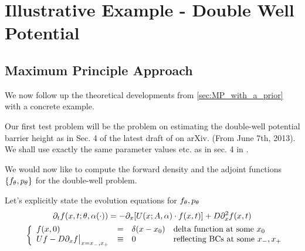 \documentclass{article}
\begin{document}

\section{Illustrative Example - Double Well Potential}
\subsection{Maximum Principle Approach}
We now follow up the theoretical developments from \cref{sec:MP_with_a_prior}
with a concrete example.

Our first test problem will be the problem on estimating the double-well
potential barrier height as in Sec. 4 of the latest draft of \cite{Lin} on
arXiv. (From June 7th, 2013). We shall use exactly the same parameter values
etc. as in sec. 4 in \cite{Lin}.

We would now like to compute the forward density and the adjoint functions
$\{{ f_{\theta}}, { p_{\theta}}\}$ for the double-well problem.

Let's explicitly state the evolution equations for ${ f_{\theta}},{ p_{\theta}}$
\begin{equation}
\begin{gathered}
{\partial}_t f(x,t; {\theta}, {\alpha}(\cdot)) = -{\partial}_x [ U(x;A, {\alpha}) \cdot f(x,t)] + D {\partial}_x^2
f(x,t)
\\
\begin{array}{ll}
	&
	\left\{ \begin{array}{lcll}
	 f(x,0) &=& \delta(x-x_0)  &\textrm{delta function at some } x_0
	\\
	U f - D {\partial}_x f \big|_{x={ x_{-} },{ x_{+} }} &\equiv& 0 & \textrm{reflecting BCs
	at some } { x_{-} }, { x_{+} } \end{array} \right.
\end{array}
\label{eq:forward_density_double_well}
\end{gathered}
\end{equation}
\end{document}
